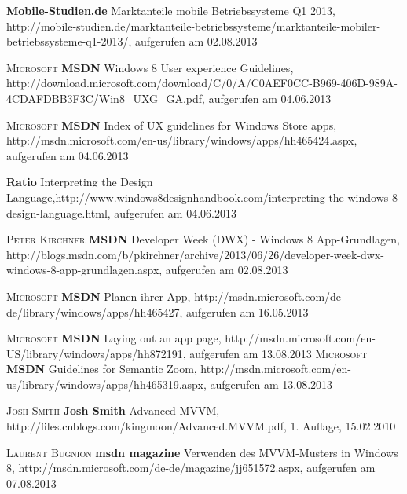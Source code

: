 \begin{thebibliography}{---}
              \textbf{Mobile-Studien.de}
              Marktanteile mobile Betriebssysteme Q1 2013, http://mobile-studien.de/marktanteile-betriebssysteme/marktanteile-mobiler-betriebssysteme-q1-2013/, aufgerufen am 02.08.2013
 
            \textsc{Microsoft}
           \textbf{MSDN}
           Windows 8 User experience Guidelines, http://download.microsoft.com/download/C/0/A/C0AEF0CC-B969-406D-989A-4CDAFDBB3F3C/Win8\_UXG\_GA.pdf, aufgerufen am 04.06.2013
                        
           \textsc{Microsoft}
          \textbf{MSDN}
          Index of UX guidelines for Windows Store apps, http://msdn.microsoft.com/en-us/library/windows/apps/hh465424.aspx, aufgerufen am 04.06.2013
          
           \textbf{Ratio}
          Interpreting the Design Language,http://www.windows8designhandbook.com/interpreting-the-windows-8-design-language.html, aufgerufen am 04.06.2013
           
            \textsc{Peter Kirchner}
           \textbf{MSDN}
           Developer Week (DWX) - Windows 8 App-Grundlagen, http://blogs.msdn.com/b/pkirchner/archive/2013/06/26/developer-week-dwx-windows-8-app-grundlagen.aspx, aufgerufen am 02.08.2013
  
                \textsc{Microsoft}
               \textbf{MSDN}
 			Planen ihrer App, http://msdn.microsoft.com/de-de/library/windows/apps/hh465427, aufgerufen am 16.05.2013
 	
 	                \textsc{Microsoft}
 	               \textbf{MSDN}
 	 			Laying out an app page, http://msdn.microsoft.com/en-US/library/windows/apps/hh872191, aufgerufen am 13.08.2013
 	  	                \textsc{Microsoft}
 	  	               \textbf{MSDN}
 	  	 			Guidelines for Semantic Zoom, http://msdn.microsoft.com/en-us/library/windows/apps/hh465319.aspx, aufgerufen am 13.08.2013

  		\textsc{Josh Smith}
  		\textbf{Josh Smith}
  Advanced MVVM, http://files.cnblogs.com/kingmoon/Advanced.MVVM.pdf, 1. Auflage, 15.02.2010 
    
                  \textsc{Laurent Bugnion}
                 \textbf{msdn magazine}
   			Verwenden des MVVM-Musters in Windows 8, http://msdn.microsoft.com/de-de/magazine/jj651572.aspx, aufgerufen am 07.08.2013
   			

\end{thebibliography}
